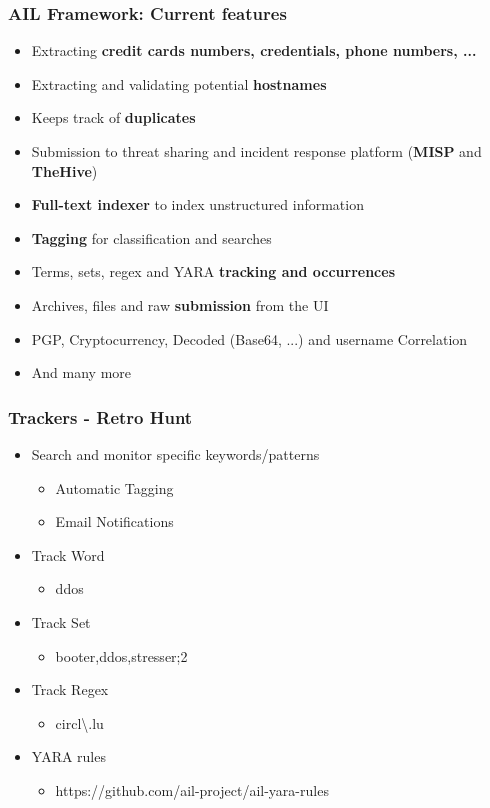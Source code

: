 \documentclass{beamer}
\begin{document}
\begin{frame}
    \frametitle{AIL Framework: Current features}
    \begin{itemize}
        \item Extracting \textbf{credit cards numbers, credentials, phone numbers, ...}
        \item Extracting and validating potential \textbf{hostnames}
        \item Keeps track of \textbf{duplicates}
        \item Submission to threat sharing and incident response platform (\textbf{MISP} and \textbf{TheHive})
        \item \textbf{Full-text indexer} to index unstructured information
        \item \textbf{Tagging} for classification and searches
        \item Terms, sets, regex and YARA \textbf{tracking and occurrences}
        \item Archives, files and raw \textbf{submission} from the UI
        \item PGP, Cryptocurrency, Decoded (Base64, ...) and username Correlation
        \item And many more
    \end{itemize}
\end{frame}


\begin{frame}
    \frametitle{Trackers - Retro Hunt}
        \begin{itemize}
        	\item Search and monitor specific keywords/patterns
        	\begin{itemize}
            	\item Automatic Tagging
            	\item Email Notifications
            \end{itemize}
            \item Track Word
            \begin{itemize}
            	\item ddos
            \end{itemize}
            \item Track Set
            \begin{itemize}
            	\item booter,ddos,stresser;2
            \end{itemize}
            \item Track Regex
            \begin{itemize}
            	\item circl\textbackslash.lu
            \end{itemize}
            \item YARA rules
            	\begin{itemize}
            	\item https://github.com/ail-project/ail-yara-rules
            \end{itemize}
        \end{itemize}
\end{frame}
\end{document}
